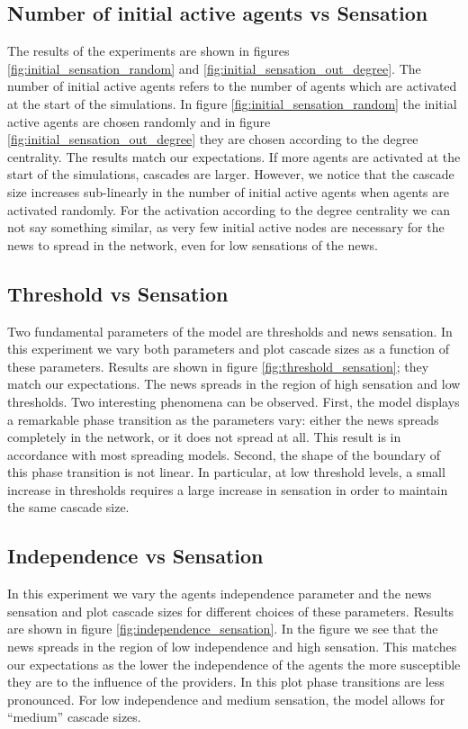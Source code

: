 \documentclass[10pt]{article}
\begin{document}
\subsection{Number of initial active agents vs Sensation}\label{subsec:inital_agents_sensation}
The results of the experiments are shown in figures \ref{fig:initial_sensation_random} and \ref{fig:initial_sensation_out_degree}. The number of initial active agents refers to the number of agents which are activated at the start of the simulations. In figure \ref{fig:initial_sensation_random} the initial active agents are chosen randomly and in figure \ref{fig:initial_sensation_out_degree} they are chosen according to the degree centrality. The results match our expectations. If more agents are activated at the start of the simulations, cascades are larger. However, we notice that the cascade size increases sub-linearly in the number of initial active agents when agents are activated randomly. For the activation according to the degree centrality we can not say something similar, as very few initial active nodes are necessary for the news to spread in the network, even for low sensations of the news.\\


\subsection{Threshold vs Sensation}\label{subsec:threshold_sensation}
Two fundamental parameters of the model are thresholds and news sensation.
In this experiment we vary both parameters and plot cascade sizes as a function of these parameters. Results are shown in figure \ref{fig:threshold_sensation}; they match our expectations. The news spreads in the region of high sensation and low thresholds.
Two interesting phenomena can be observed. First, the model displays a remarkable phase transition as the parameters vary: either the news spreads completely in the network, or it does not spread at all.
This result is in accordance with most spreading models. Second, the shape of the boundary of this phase transition is not linear. In particular, at low threshold levels, a small increase in thresholds requires a large increase in sensation in order to maintain the same cascade size. 

\subsection{Independence vs Sensation}\label{subsec:independence_sensation}
In this experiment we vary the agents independence parameter and the news sensation and plot cascade sizes for different choices of these parameters. Results are shown in figure \ref{fig:independence_sensation}. In the figure we see that the news spreads in the region of low independence and high sensation. This matches our expectations as the lower the independence of the agents the more susceptible they are to the influence of the providers.
In this plot phase transitions are less pronounced. For low independence and medium sensation, the model allows for ``medium'' cascade sizes. 
\end{document}
